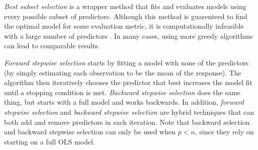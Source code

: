 \documentclass{article}
\begin{document}

	
	\textit{Best subset selection} is a wrapper method that fits and evaluates models using every possible subset of predictors. Although this method is guarenteed to find the optimal model for some evaluation metric, it is computationally infeasible with a large number of predictors \cite{miller2002subset}. In many cases, using more greedy algorithms can lead to comparable results.
	
	\textit{Forward stepwise selection} starts by fitting a model with none of the predictors (by simply estimating each observation to be the mean of the response). The algorithm then iteratively chooses the predictor that best increases the model fit until a stopping condition is met. \textit{Backward stepwise selection} does the same thing, but starts with a full model and works backwards. In addition, \textit{forward stepwise selection} and \textit{backward stepwise selection} are hybrid techniques that can both add and remove predictors in each iteration. Note that backward selection and backward stepwise selection can only be used when $p < n$, since they rely on starting on a full OLS model.
	
\end{document}
